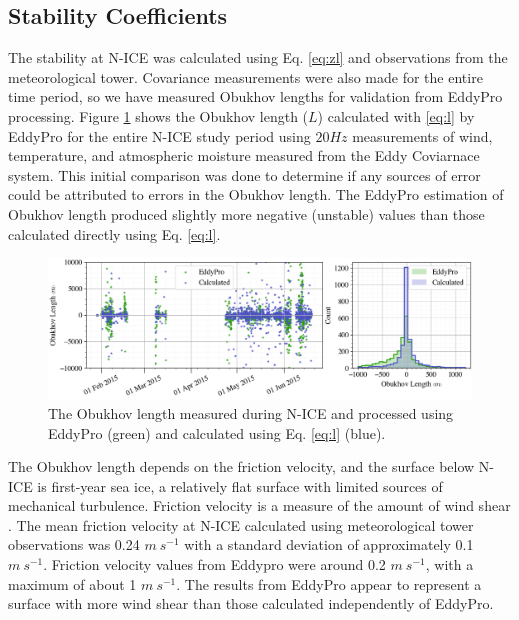 \subsection{Stability Coefficients}
The stability at N-ICE was calculated using Eq. \ref{eq:zl} and observations from the meteorological tower. Covariance measurements were also made for the entire time period, so we have measured Obukhov lengths for validation from EddyPro processing. Figure \ref{fig:ol} shows the Obukhov length ($L$) calculated with \ref{eq:l} by EddyPro for the entire N-ICE study period using $20Hz$ measurements of wind, temperature, and atmospheric moisture measured from the Eddy Coviarnace system. This initial comparison was done to determine if any sources of error could be attributed to errors in the Obukhov length. The EddyPro estimation of Obukhov length produced slightly more negative (unstable) values than those calculated directly using Eq. \ref{eq:l}. 

\begin{figure}[b!]
    \centering
    \includegraphics[width=1\linewidth]{figures/chapter5/ch3_obukhovlength.png}
    \caption[Obukhov length]{The Obukhov length measured during N-ICE and processed using EddyPro (green) and calculated using Eq. \ref{eq:l} (blue).}
    \label{fig:ol}
\end{figure}

The Obukhov length depends on the friction velocity, and the surface below N-ICE is first-year sea ice, a relatively flat surface with limited sources of mechanical turbulence. Friction velocity is a measure of the amount of wind shear \citep{stull:1988}. The mean friction velocity at N-ICE calculated using meteorological tower observations was 0.24 $m~s^{-1}$ with a standard deviation of approximately 0.1 $m~s^{-1}$. Friction velocity values from Eddypro were around 0.2 $m~s^{-1}$, with a maximum of about 1 $m~s^{-1}$. The results from EddyPro appear to represent a surface with more wind shear than those calculated independently of EddyPro. 


